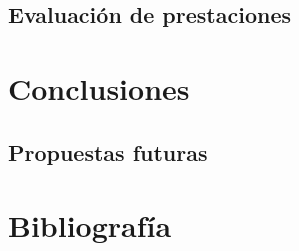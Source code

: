 \documentclass[12pt]{article}
\begin{document}
	\subsection{Evaluación de prestaciones}
	
	\pagebreak
	
	\section{Conclusiones}
	
	\subsection{Propuestas futuras}
	

	\pagebreak
	\section*{Bibliografía}
\end{document}
